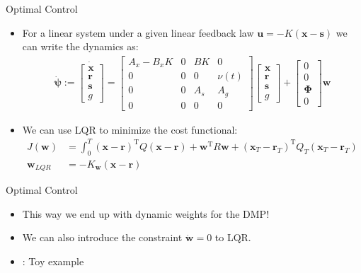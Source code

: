 \documentclass[handout]{beamer}
\newcommand{\todo}{\color{red}{TODO}} %
\newcommand{\fullvec}{\boldsymbol{\psi}} %
\newcommand{\basis}{\mathbf{\Phi}} %
\newcommand{\state}{\mathbf{x}} %
\newcommand{\traj}{\mathbf{r}} %
\newcommand{\dmp}{\mathbf{s}} %
\newcommand{\sysInput}{\mathbf{u}} %
\newcommand{\weights}{\mathbf{w}} %
\begin{document}
%
\begin{frame}{Optimal Control}
\begin{itemize}
\item For a linear system under a given linear feedback law $\sysInput = -K(\state - \dmp)$ we can write the dynamics as:
\begin{equation*}
\begin{aligned}
 \dot{\fullvec} := \dot{
 \begin{bmatrix}
  \state \\
  \traj \\
  \dmp \\
  g
 \end{bmatrix}} = 
 \begin{bmatrix}
  A_x - B_xK & 0 & BK & 0 \\
  0 & 0 & 0 & \nu(t) \\
  0  & 0  & A_s & A_g  \\
  0 & 0 & 0 & 0
 \end{bmatrix}
 \begin{bmatrix}
   \state \\
   \traj \\
   \dmp \\
   g
  \end{bmatrix} +
  \begin{bmatrix}
    0 \\
    0 \\
    \basis \\
    0
   \end{bmatrix} \weights
\end{aligned}
\end{equation*}
\item We can use LQR to minimize the cost functional:
\begin{equation*}
\begin{aligned}
J(\weights) &= \int_{0}^{T} (\state - \traj)^{\mathrm{T}}Q(\state - \traj) + \weights^{\mathrm{T}}R\weights + (\state_T-\traj_T)^{\mathrm{T}}Q_{T}(\state_T-\traj_T) \\
\weights_{LQR} &= -K_{\weights}(\state - \traj)
\end{aligned}
\end{equation*}
\end{itemize}
\end{frame}
%
\begin{frame}{Optimal Control}
\begin{itemize}
\item This way we end up with dynamic weights for the DMP!
\item We can also introduce the constraint $\dot{\weights} = 0$ to LQR.
\item \todo: Toy example 
\end{itemize}
\end{frame}	
\end{document}
